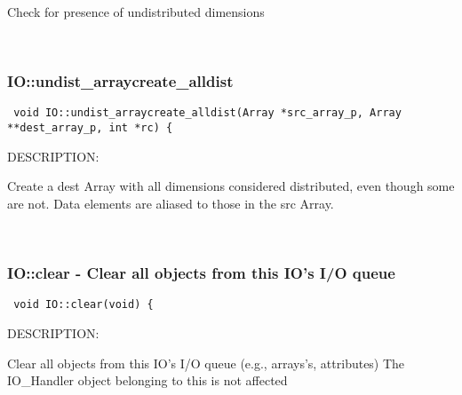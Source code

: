         Check for presence of undistributed dimensions
   
 
\mbox{}\hrulefill\ 
 
\subsubsection [IO::undist\_arraycreate\_alldist] {IO::undist\_arraycreate\_alldist}


  
\begin{verbatim} void IO::undist_arraycreate_alldist(Array *src_array_p, Array **dest_array_p, int *rc) {\end{verbatim}
{\sf DESCRIPTION:\\ }


        Create a dest Array with all dimensions considered distributed,
        even though some are not.  Data elements are aliased to those in
        the src Array.
   
 
\mbox{}\hrulefill\ 
 
\subsubsection [IO::clear] {IO::clear - Clear all objects from this IO's I/O queue}


  
\begin{verbatim} void IO::clear(void) {\end{verbatim}
{\sf DESCRIPTION:\\ }


        Clear all objects from this IO's I/O queue (e.g., arrays's, attributes)
        The IO_Handler object belonging to this is not affected
  
\setlength{\parskip}{\oldparskip}
\setlength{\parindent}{\oldparindent}
\setlength{\baselineskip}{\oldbaselineskip}
